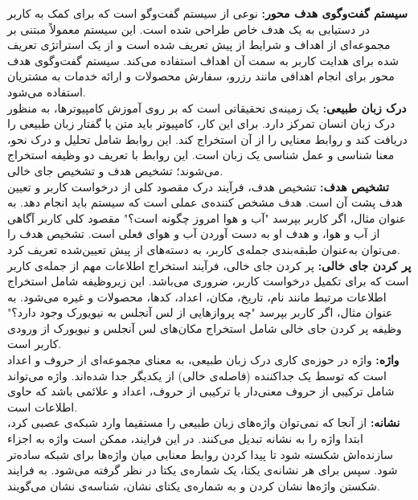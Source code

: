 \textbf{سیستم گفت‌وگوی هدف محور:}
نوعی از سیستم گفت‌وگو است که برای کمک به کاربر در دستیابی به یک هدف خاص طراحی شده است. این سیستم معمولاً مبتنی بر مجموعه‌ای از اهداف و شرایط از پیش تعریف شده است و از یک استراتژی تعریف شده برای هدایت کاربر به سمت آن اهداف استفاده می‌کند. سیستم گفت‌وگوی هدف محور برای انجام اهدافی مانند رزرو، سفارش محصولات و ارائه خدمات به مشتریان استفاده می‌شود.
\\
\textbf{درک زبان طبیعی:}
یک زمینه‌ی تحقیقاتی است که بر روی آموزش کامپیوترها، به منظور درک زبان انسان تمرکز دارد. برای این کار، کامپیوتر باید متن یا گفتار زبان طبیعی را دریافت کند و روابط معنایی را از آن استخراج کند. این روابط شامل  تحلیل و درک نحو، معنا شناسی و عمل شناسی یک زبان است. این روابط با تعریف دو وظیفه استخراج می‌شوند؛ تشخیص هدف و تشخیص جای خالی.
\\
\textbf{تشخیص هدف:}
تشخیص هدف، فرآیند درک مقصود کلی از درخواست کاربر و تعیین هدف پشت آن است. هدف مشخص کننده‌ی عملی است که سیستم باید انجام دهد. به عنوان مثال، اگر کاربر بپرسد "آب و هوا امروز چگونه است؟" مقصود کلی کاربر آگاهی از آب و هوا، و هدف او به دست آوردن آب و هوای فعلی است. تشخیص هدف را می‌توان به‌عنوان طبقه‌بندی جمله‌ی کاربر، به دسته‌های از پیش تعیین‌شده تعریف کرد.
\\
\textbf{پر کردن جای خالی:}
پر کردن جای خالی، فرآیند استخراج اطلاعات مهم از جمله‌ی کاربر است که برای تکمیل درخواست کاربر، ضروری می‌باشد. این زیروظیفه شامل استخراج اطلاعات مرتبط مانند نام، تاریخ، مکان، اعداد، کدها، محصولات و غیره می‌شود. به عنوان مثال، اگر کاربر بپرسد "چه پروازهایی از لس آنجلس به نیویورک وجود دارد؟" وظیفه پر کردن جای خالی شامل استخراج مکان‌های لس آنجلس و نیویورک از ورودی کاربر است.
\\
\textbf{واژه:}
واژه در حوزه‌ی کاری درک زبان طبیعی، به معنای مجموعه‌ای از حروف و اعداد است که توسط یک جداکننده (فاصله‌ی خالی) از یکدیگر جدا شده‌اند. واژه می‌تواند شامل ترکیبی از حروف معنی‌دار یا ترکیبی از حروف، اعداد و علائمی باشد که حاوی اطلاعات است.
\\
\textbf{نشانه:}
از آنجا که نمی‌توان واژه‌های زبان طبیعی را مستقیما وارد شبکه‌ی عصبی کرد، ابتدا واژه را به نشانه تبدیل می‌کنند. در این فرایند، ممکن است واژه به اجزاء سازنده‌اش شکسته شود تا پیدا کردن روابط معنایی میان واژه‌ها برای شبکه ساده‌تر شود. سپس برای هر نشانه‌ی یکتا، یک شماره‌ی یکتا در نظر گرفته می‌شود. به فرایند شکستن واژه‌ها نشان کردن و به شماره‌ی یکتای نشان، شناسه‌ی نشان می‌گویند. 


